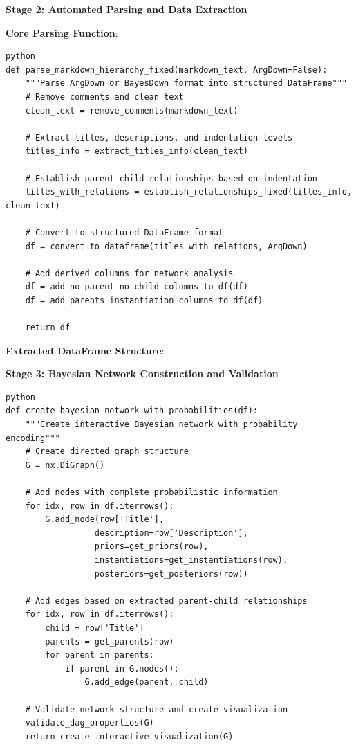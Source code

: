 \documentclass[
  11pt,
  letterpaper,
]{book}
\begin{document}
\textbf{Stage 2: Automated Parsing and Data Extraction}

\textbf{Core Parsing Function}:

\begin{verbatim}
python
def parse_markdown_hierarchy_fixed(markdown_text, ArgDown=False):
    """Parse ArgDown or BayesDown format into structured DataFrame"""
    # Remove comments and clean text
    clean_text = remove_comments(markdown_text)
    
    # Extract titles, descriptions, and indentation levels  
    titles_info = extract_titles_info(clean_text)
    
    # Establish parent-child relationships based on indentation
    titles_with_relations = establish_relationships_fixed(titles_info, clean_text)
    
    # Convert to structured DataFrame format
    df = convert_to_dataframe(titles_with_relations, ArgDown)
    
    # Add derived columns for network analysis
    df = add_no_parent_no_child_columns_to_df(df)
    df = add_parents_instantiation_columns_to_df(df)
    
    return df
\end{verbatim}

\textbf{Extracted DataFrame Structure}:

\textbf{Stage 3: Bayesian Network Construction and Validation}

\begin{verbatim}
python
def create_bayesian_network_with_probabilities(df):
    """Create interactive Bayesian network with probability encoding"""
    # Create directed graph structure
    G = nx.DiGraph()
    
    # Add nodes with complete probabilistic information
    for idx, row in df.iterrows():
        G.add_node(row['Title'], 
                  description=row['Description'],
                  priors=get_priors(row),
                  instantiations=get_instantiations(row),
                  posteriors=get_posteriors(row))
    
    # Add edges based on extracted parent-child relationships  
    for idx, row in df.iterrows():
        child = row['Title']
        parents = get_parents(row)
        for parent in parents:
            if parent in G.nodes():
                G.add_edge(parent, child)
    
    # Validate network structure and create visualization
    validate_dag_properties(G)
    return create_interactive_visualization(G)
\end{verbatim}
\end{document}
